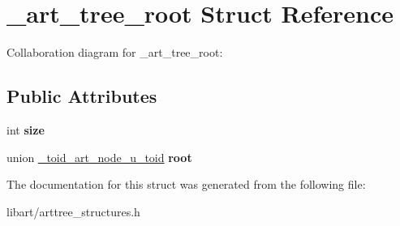 \hypertarget{struct__art__tree__root}{}\section{\+\_\+art\+\_\+tree\+\_\+root Struct Reference}
\label{struct__art__tree__root}


Collaboration diagram for \+\_\+art\+\_\+tree\+\_\+root\+:
\subsection*{Public Attributes}
\begin{DoxyCompactItemize}
\item 
\mbox{\label{struct__art__tree__root_aca717aef2b7622c34beb35a5fde6f00f}} 
int {\bfseries size}
\item 
\mbox{\label{struct__art__tree__root_a33cff6a7215f0a112cb96266673c9b99}} 
union \hyperlink{union__toid__art__node__u__toid}{\+\_\+toid\+\_\+art\+\_\+node\+\_\+u\+\_\+toid} {\bfseries root}
\end{DoxyCompactItemize}


The documentation for this struct was generated from the following file\+:\begin{DoxyCompactItemize}
\item 
libart/arttree\+\_\+structures.\+h\end{DoxyCompactItemize}

